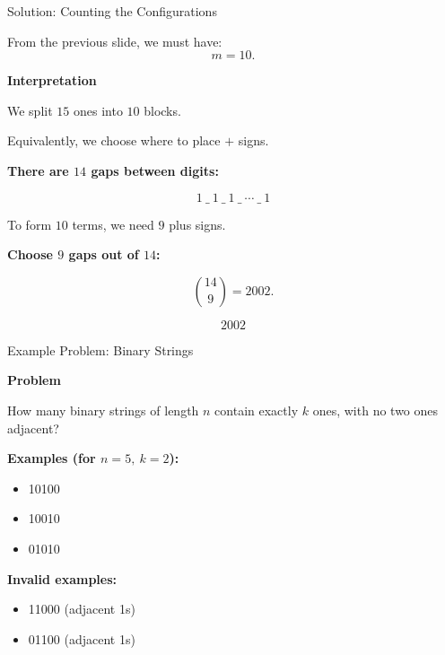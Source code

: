 \begin{frame}{Solution: Counting the Configurations}

From the previous slide, we must have:
\[
m = 10.
\]

\medskip

\textbf{Interpretation}

We split $15$ ones into $10$ blocks.

\medskip

Equivalently, we choose where to place $+$ signs.

\medskip

\textbf{There are $14$ gaps between digits:}

\[
1 \ \_ \ 1 \ \_ \ 1 \ \_ \ \cdots \ \_ \ 1
\]

\medskip

To form $10$ terms, we need $9$ plus signs.

\medskip

\textbf{Choose $9$ gaps out of $14$:}

\[
\binom{14}{9} = 2002.
\]

\medskip

\[
\boxed{2002}
\]

\end{frame}








\begin{frame}{Example Problem: Binary Strings}

\textbf{Problem}

\medskip

How many binary strings of length $n$ contain exactly $k$ ones, with no two ones adjacent?

\medskip

\textbf{Examples (for $n=5,\ k=2$):}
\begin{itemize}
    \item 10100
    \item 10010
    \item 01010
\end{itemize}

\medskip

\textbf{Invalid examples:}
\begin{itemize}
    \item 11000 \quad (adjacent 1s)
    \item 01100 \quad (adjacent 1s)
\end{itemize}

\end{frame}

